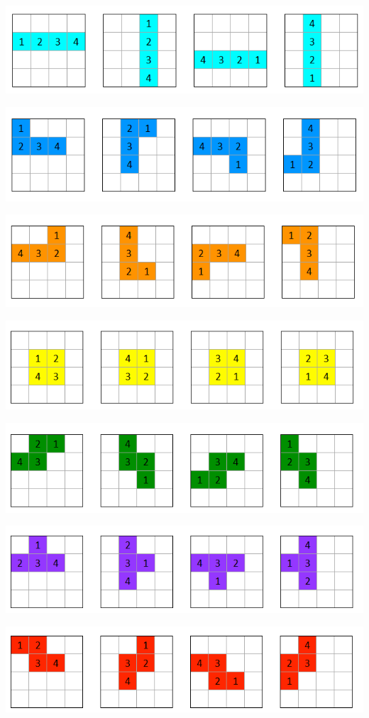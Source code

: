 \documentclass[a4paper]{article}
\begin{document}
	\begin{center}


	\includegraphics[scale=0.7]{resources/img/orientations/cyan}
	\label{img:cyan}

	\includegraphics[scale=0.7]{resources/img/orientations/blue}
	\label{img:blue}

	\includegraphics[scale=0.7]{resources/img/orientations/orange}
	\label{img:orange}
	
	\includegraphics[scale=0.7]{resources/img/orientations/yellow}
	\label{img:yellow}

	\includegraphics[scale=0.7]{resources/img/orientations/green}
	\label{img:green}

	\includegraphics[scale=0.7]{resources/img/orientations/purple}
	\label{img:purple}

	\includegraphics[scale=0.7]{resources/img/orientations/red}
	\label{img:red}

	\end{center}
	
\end{document}
